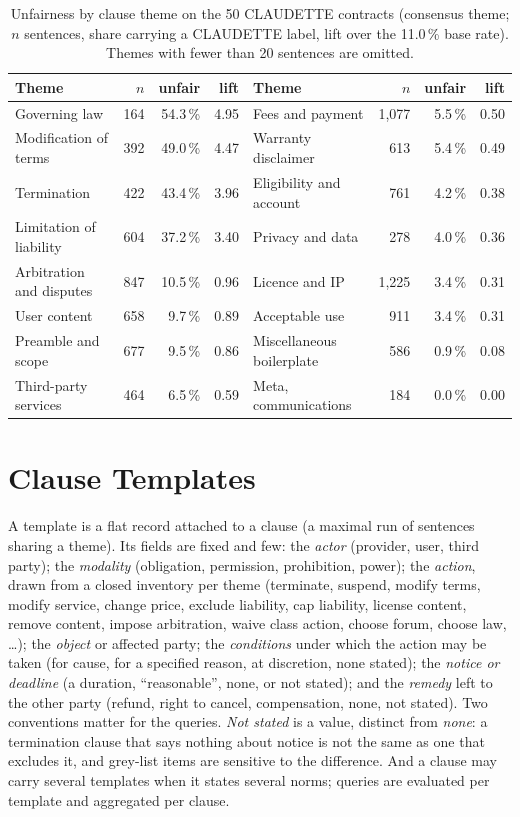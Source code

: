 \documentclass{IOS-Book-Article}
\newcommand{\corpus}{CLAUDETTE}
\begin{document}
\begin{table}[t]
\caption{Unfairness by clause theme on the 50 \corpus{} contracts (consensus theme; $n$ sentences, share carrying a \corpus{} label, lift over the 11.0\,\% base rate). Themes with fewer than 20 sentences are omitted.}
\label{tab:themes}
\centering
\footnotesize\setlength{\tabcolsep}{3.5pt}%
\begin{tabular}{@{}lrrr@{\quad}lrrr@{}}
\toprule
Theme & $n$ & unfair & lift & Theme & $n$ & unfair & lift \\
\midrule
Governing law & 164 & 54.3\,\% & 4.95 & Fees and payment & 1,077 & 5.5\,\% & 0.50 \\
Modification of terms & 392 & 49.0\,\% & 4.47 & Warranty disclaimer & 613 & 5.4\,\% & 0.49 \\
Termination & 422 & 43.4\,\% & 3.96 & Eligibility and account & 761 & 4.2\,\% & 0.38 \\
Limitation of liability & 604 & 37.2\,\% & 3.40 & Privacy and data & 278 & 4.0\,\% & 0.36 \\
Arbitration and disputes & 847 & 10.5\,\% & 0.96 & Licence and IP & 1,225 & 3.4\,\% & 0.31 \\
User content & 658 & 9.7\,\% & 0.89 & Acceptable use & 911 & 3.4\,\% & 0.31 \\
Preamble and scope & 677 & 9.5\,\% & 0.86 & Miscellaneous boilerplate & 586 & 0.9\,\% & 0.08 \\
Third-party services & 464 & 6.5\,\% & 0.59 & Meta, communications & 184 & 0.0\,\% & 0.00 \\
\bottomrule
\end{tabular}
\end{table}

\section{Clause Templates}
\label{sec:templates}
A template is a flat record attached to a clause (a maximal run of sentences sharing a theme). Its fields are fixed and few: the \emph{actor} (provider, user, third party); the \emph{modality} (obligation, permission, prohibition, power); the \emph{action}, drawn from a closed inventory per theme (terminate, suspend, modify terms, modify service, change price, exclude liability, cap liability, license content, remove content, impose arbitration, waive class action, choose forum, choose law, \ldots); the \emph{object} or affected party; the \emph{conditions} under which the action may be taken (for cause, for a specified reason, at discretion, none stated); the \emph{notice or deadline} (a duration, ``reasonable'', none, or not stated); and the \emph{remedy} left to the other party (refund, right to cancel, compensation, none, not stated). Two conventions matter for the queries. \emph{Not stated} is a value, distinct from \emph{none}: a termination clause that says nothing about notice is not the same as one that excludes it, and grey-list items are sensitive to the difference. And a clause may carry several templates when it states several norms; queries are evaluated per template and aggregated per clause.
\end{document}
